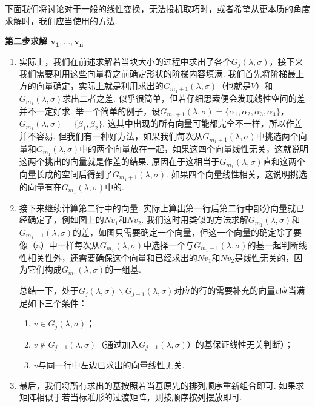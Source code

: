 \begin{solution}

\end{solution}

下面我们将讨论对于一般的线性变换，无法投机取巧时，或者希望从更本质的角度求解时，我们应当使用的方法.

\begin{center}
    \textbf{\heiti 第二步\quad 求解 $\boldsymbol{v_1,\ldots,v_n}$}
\end{center}

\begin{enumerate}
    \item 实际上，我们在前述求解若当块大小的过程中求出了各个$G_j(\lambda,\sigma)$，接下来我们需要利用这些向量将之前确定形状的阶梯内容填满. 我们首先将阶梯最上方的向量确定，实际上就是利用求出的$G_{m_1+1}(\lambda,\sigma)$（也就是$V$）和$G_{m_1}(\lambda,\sigma)$求出二者之差. 似乎很简单，但若仔细思索便会发现线性空间的差并不一定好求. 举一个简单的例子，设$G_{m_1+1}(\lambda,\sigma)=\{\alpha_1,\alpha_2,\alpha_3,\alpha_4\}$，$G_{m_1}(\lambda,\sigma)=\{\beta_1,\beta_2\}$. 这其中出现的所有向量可能都完全不一样，所以作差并不容易. 但我们有一种好方法，如果我们每次从$G_{m_1+1}(\lambda,\sigma)$中挑选两个向量和$G_{m_1}(\lambda,\sigma)$中的两个向量放在一起，如果这四个向量线性无关，这就说明这两个挑出的向量就是作差的结果. 原因在于这相当于$G_{m_1}(\lambda,\sigma)$直和这两个向量长成的空间后得到了$G_{m_1+1}(\lambda,\sigma)$. 如果四个向量线性相关，这说明挑选的向量有在$G_{m_1}(\lambda,\sigma)$中的.

    \item 接下来继续计算第二行中的向量. 实际上算出第一行后第二行中部分向量就已经确定了，例如图上的$Nv_1$和$Nv_2$. 我们这时用类似的方法求解$G_{m_1}(\lambda,\sigma)$和$G_{m_1-1}(\lambda,\sigma)$的差，如图只需要确定一个向量，但这一个向量的确定除了要像（a）中一样每次从$G_{m_1}(\lambda,\sigma)$中选择一个与$G_{m_1-1}(\lambda,\sigma)$的基一起判断线性相关性外，还需要确保这个向量和已经求出的$Nv_1$和$Nv_2$是线性无关的，因为它们构成$G_{m_1}(\lambda,\sigma)$的一组基.

        总结一下，处于$G_j(\lambda,\sigma)\backslash G_{j-1}(\lambda,\sigma)$对应的行的需要补充的向量$v$应当满足如下三个条件：
        \begin{enumerate}
            \item $v\in G_j(\lambda,\sigma)$；

            \item $v\notin G_{j-1}(\lambda,\sigma)$（通过加入$G_{j-1}(\lambda,\sigma)$）的基保证线性无关判断）；

            \item $v$与同一行中左边已求出的向量线性无关.
        \end{enumerate}

    \item 最后，我们将所有求出的基按照若当基原先的排列顺序重新组合即可. 如果求矩阵相似于若当标准形的过渡矩阵，则按顺序按列摆放即可.
\end{enumerate}

